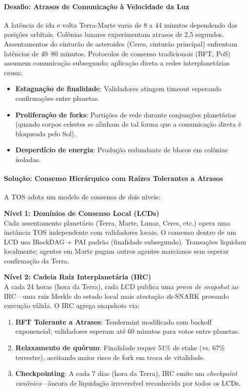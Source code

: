 \documentclass[11pt]{article}
\begin{document}
\paragraph{Desafio: Atrasos de Comunicação à Velocidade da Luz}
A latência de ida e volta Terra-Marte varia de 8 a 44 minutos dependendo das posições orbitais. Colônias lunares experimentam atrasos de 2,5 segundos. Assentamentos do cinturão de asteroides (Ceres, cinturão principal) enfrentam latências de 40--80 minutos. Protocolos de consenso tradicionais (BFT, PoS) assumem comunicação subsegundo; aplicação direta a redes interplanetárias causa:
\begin{itemize}[noitemsep]
  \item \textbf{Estagnação de finalidade}: Validadores atingem timeout esperando confirmações entre planetas.
  \item \textbf{Proliferação de forks}: Partições de rede durante conjunções planetárias (quando corpos celestes se alinham de tal forma que a comunicação direta é bloqueada pelo Sol).
  \item \textbf{Desperdício de energia}: Produção redundante de blocos em colônias isoladas.
\end{itemize}

\paragraph{Solução: Consenso Hierárquico com Raízes Tolerantes a Atrasos}
A TOS adota um modelo de consenso de dois níveis:

\textbf{Nível 1: Domínios de Consenso Local (LCDs)}\\
Cada assentamento planetário (Terra, Marte, Lunar, Ceres, etc.) opera uma instância TOS independente com validadores locais. O consenso dentro de um LCD usa BlockDAG + PAI padrão (finalidade subsegundo). Transações liquidam localmente; agentes em Marte pagam outros agentes marcianos sem esperar confirmação da Terra.

\textbf{Nível 2: Cadeia Raiz Interplanetária (IRC)}\\
A cada 24 horas (hora da Terra), cada LCD publica uma \emph{prova de snapshot} ao IRC—uma raiz Merkle do estado local mais atestação zk-SNARK provando execução válida. O IRC agrega snapshots via:
\begin{enumerate}[noitemsep]
  \item \textbf{BFT Tolerante a Atrasos}: Tendermint modificado com backoff exponencial; validadores esperam até 60 minutos para votos entre planetas.
  \item \textbf{Relaxamento de quórum}: Finalidade requer 51\% de stake (vs. 67\% terrestre), aceitando maior risco de fork em troca de vitalidade.
  \item \textbf{Checkpointing}: A cada 7 dias (hora da Terra), IRC emite um \emph{checkpoint canônico}—âncora de liquidação irreversível reconhecida por todos os LCDs.
\end{enumerate}
\end{document}

